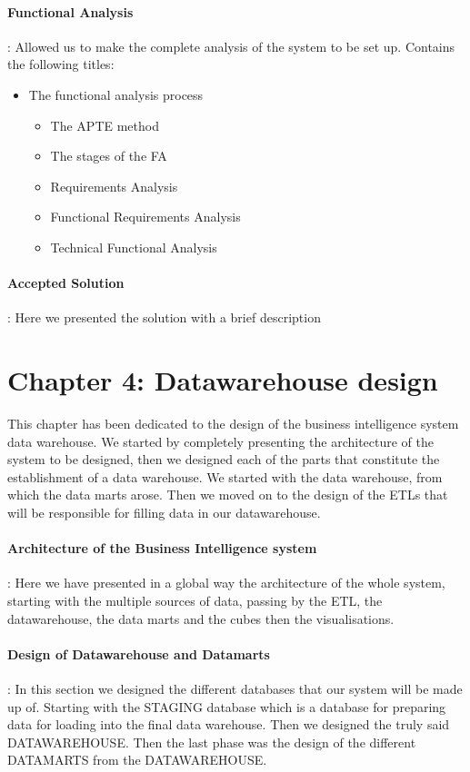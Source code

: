 \paragraph{Functional Analysis}: Allowed us to make the complete analysis of the system to be set up. Contains the following titles: 
\begin{itemize}
    \item The functional analysis process
    \begin{itemize}
        \item The APTE method
        \item The stages of the FA
        \item Requirements Analysis 
        \item Functional Requirements Analysis
        \item Technical Functional Analysis
    \end{itemize}
\end{itemize}

\paragraph{Accepted Solution}: Here we presented the solution with a brief description

\section*{Chapter 4: Datawarehouse design}
This chapter has been dedicated to the design of the business intelligence system data warehouse. We started by completely presenting the architecture of the system to be designed, then we designed each of the parts that constitute the establishment of a data warehouse. We started with the data warehouse, from which the data marts arose. Then we moved on to the design of the ETLs that will be responsible for filling data in our datawarehouse.

\paragraph{Architecture of the Business Intelligence system}: Here we have presented in a global way the architecture of the whole system, starting with the multiple sources of data, passing by the ETL, the datawarehouse, the data marts and the cubes then the visualisations.

\paragraph{Design of Datawarehouse and Datamarts}: In this section we designed the different databases that our system will be made up of. Starting with the STAGING database which is a database for preparing data for loading into the final data warehouse. Then we designed the truly said DATAWAREHOUSE. Then the last phase was the design of the different DATAMARTS from the DATAWAREHOUSE. 

